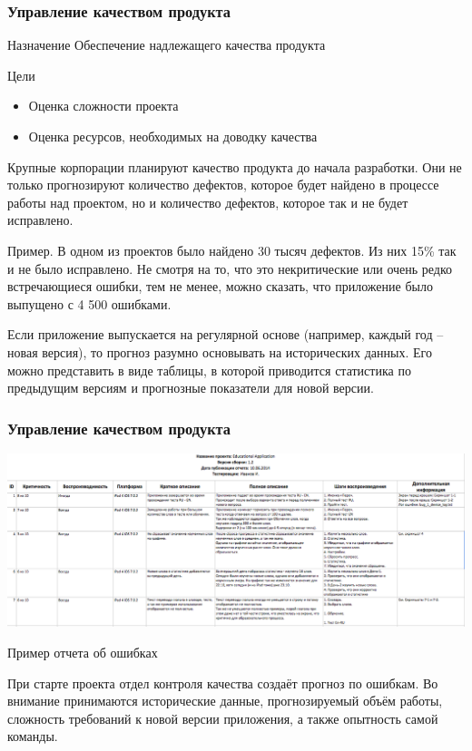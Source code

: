 \documentclass{../industrial-development}
\begin{document}
\begin{frame} \frametitle{Управление качеством продукта}
	\begin{block}{Назначение}
		Обеспечение надлежащего качества продукта
	\end{block}
	Цели
	\begin{itemize}
		\item Оценка сложности проекта
		\item Оценка ресурсов, необходимых на доводку качества
	\end{itemize}
\end{frame}
\lecturenotes

Крупные корпорации планируют качество продукта до начала разработки. Они не только прогнозируют количество дефектов, которое будет найдено в процессе работы над проектом, но и количество дефектов, которое так и не будет исправлено.

Пример. В одном из проектов было найдено 30 тысяч дефектов. Из них 15\% так и не было исправлено. Не смотря на то, что это некритические или очень редко встречающиеся ошибки, тем не менее, можно сказать, что приложение было выпущено с 4 500 ошибками.

Если приложение выпускается на регулярной основе (например, каждый год – новая версия), то прогноз разумно основывать на исторических данных. Его можно представить в виде таблицы, в которой приводится статистика по предыдущим версиям и прогнозные показатели для новой версии.

\begin{frame} \frametitle{Управление качеством продукта}
	\centerline{\includegraphics[width=1\textwidth]{testing.png}}
	\centerline{Пример отчета об ошибках}
\end{frame}
\lecturenotes

При старте проекта отдел контроля качества создаёт прогноз по ошибкам. Во внимание принимаются исторические данные, прогнозируемый объём работы, сложность требований к новой версии приложения, а также опытность самой команды.
\end{document}

